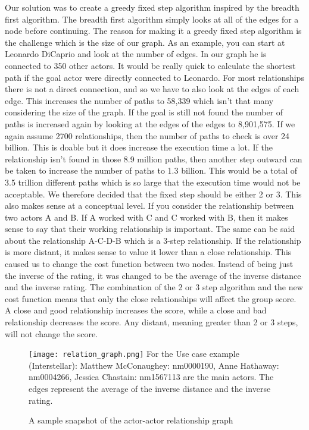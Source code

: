 Our solution was to create a greedy fixed step algorithm inspired by the breadth first algorithm. The breadth first algorithm simply looks at all of the edges for a node before continuing. The reason for making it a greedy fixed step algorithm is the challenge which is the size of our graph. As an example, you can start at Leonardo DiCaprio and look at the number of edges. In our graph he is connected to 350 other actors. It would be really quick to calculate the shortest path if the goal actor were directly connected to Leonardo. For most relationships there is not a direct connection, and so we have to also look at the edges of each edge. This increases the number of paths to 58,339 which isn’t that many considering the size of the graph. If the goal is still not found the number of paths is increased again by looking at the edges of the edges to 8,901,575. If we again assume 2700 relationships, then the number of paths to check is over 24 billion. This is doable but it does increase the execution time a lot. If the relationship isn’t found in those 8.9 million paths, then another step outward can be taken to increase the number of paths to 1.3 billion. This would be a total of 3.5 trillion different paths which is so large that the execution time would not be acceptable. We therefore decided that the fixed step should be either 2 or 3. This also makes sense at a conceptual level. If you consider the relationship between two actors A and B. If A worked with C and C worked with B, then it makes sense to say that their working relationship is important. The same can be said about the relationship A-C-D-B which is a 3-step relationship. If the relationship is more distant, it makes sense to value it lower than a close relationship. This caused us to change the cost function between two nodes. Instead of being just the inverse of the rating, it was changed to be the average of the inverse distance and the inverse rating. The combination of the 2 or 3 step algorithm and the new cost function means that only the close relationships will affect the group score. A close and good relationship increases the score, while a close and bad relationship decreases the score. Any distant, meaning greater than 2 or 3 steps, will not change the score.

\begin{figure}[t]
    \centering
    \texttt{[image: relation\_graph.png]}
    \justifying
    \small
    For the Use case example (Interstellar): Matthew McConaughey: nm0000190, Anne Hathaway: nm0004266, Jessica Chastain: nm1567113 are the main actors. The edges represent the average of the inverse distance and the inverse rating.
    \caption{A sample snapshot of the actor-actor relationship graph}
\end{figure}

